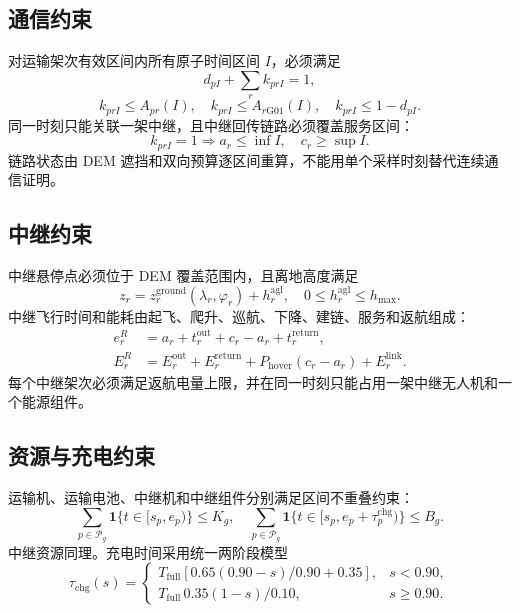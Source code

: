 \documentclass[UTF8,a4paper,12pt]{ctexart}
\newcommand{\Gone}{\mathrm{G01}}
\begin{document}
\subsection{通信约束}

对运输架次有效区间内所有原子时间区间 $I$，必须满足
\begin{equation}
 d_{pI}+\sum_r k_{prI}=1,
\end{equation}
\begin{equation}
 k_{prI}\le A_{p r}(I),\quad k_{prI}\le A_{r\Gone}(I),\quad
 k_{prI}\le 1-d_{pI}.
\end{equation}
同一时刻只能关联一架中继，且中继回传链路必须覆盖服务区间：
\begin{equation}
 k_{prI}=1\Rightarrow a_r\le \inf I,\quad c_r\ge\sup I.
\end{equation}
链路状态由 DEM 遮挡和双向预算逐区间重算，不能用单个采样时刻替代连续通信证明。

\subsection{中继约束}

中继悬停点必须位于 DEM 覆盖范围内，且离地高度满足
\begin{equation}
 z_r=z_r^{\mathrm{ground}}(\lambda_r,\varphi_r)+h_r^{\mathrm{agl}},\quad 0\le h_r^{\mathrm{agl}}\le h_{\max}.
\end{equation}
中继飞行时间和能耗由起飞、爬升、巡航、下降、建链、服务和返航组成：
\begin{align}
 e_r^R&=a_r+t_r^{\mathrm{out}}+c_r-a_r+t_r^{\mathrm{return}},\\
 E_r^R&=E_r^{\mathrm{out}}+E_r^{\mathrm{return}}+P_{\mathrm{hover}}(c_r-a_r)+E_r^{\mathrm{link}}.
\end{align}
每个中继架次必须满足返航电量上限，并在同一时刻只能占用一架中继无人机和一个能源组件。

\subsection{资源与充电约束}

运输机、运输电池、中继机和中继组件分别满足区间不重叠约束：
\begin{equation}
 \sum_{p\in\mathcal P_g} \mathbf 1\{t\in[s_p,e_p)\}\le K_g,
\quad
 \sum_{p\in\mathcal P_g}\mathbf 1\{t\in[s_p,e_p+\tau_p^{\mathrm{chg}})\}\le B_g.
\end{equation}
中继资源同理。充电时间采用统一两阶段模型
\begin{equation}
 \tau_{\mathrm{chg}}(s)=
 \begin{cases}
 T_{\mathrm{full}}[0.65(0.90-s)/0.90+0.35],&s<0.90,\\
 T_{\mathrm{full}}\,0.35(1-s)/0.10,&s\ge0.90.
 \end{cases}
\end{equation}
\end{document}
